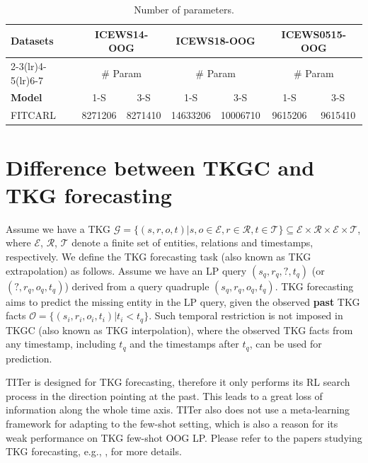 \documentclass[runningheads]{llncs}
\begin{document}
\begin{table}[htbp]
\caption{Number of parameters.}
    \label{tab: num of param}
      \centering
        \begin{tabular}{lcccccc} 
      \toprule %
     \multicolumn{1}{l}{\textbf{Datasets}} & \multicolumn{2}{c}{\textbf{ICEWS14-OOG}} & \multicolumn{2}{c}{\textbf{ICEWS18-OOG}} &\multicolumn{2}{c}{\textbf{ICEWS0515-OOG}} \\
      \cmidrule(lr){2-3}\cmidrule(lr){4-5}\cmidrule(lr){6-7}
       & \multicolumn{2}{c}{\# Param}  & \multicolumn{2}{c}{\# Param} & \multicolumn{2}{c}{\# Param} \\
      \textbf{Model} & 1-S & 3-S & 1-S & 3-S & 1-S & 3-S\\
       \midrule
       FITCARL & 8271206 & 8271410 & 14633206 & 10006710 & 9615206 & 9615410 \\
       
      \bottomrule %
    \end{tabular} 
        
    
\end{table}
\section{Difference between TKGC and TKG forecasting}
Assume we have a TKG $\mathcal{G} = \{(s,r,o,t)|s,o \in \mathcal{E}, r \in \mathcal{R}, t \in \mathcal{T}\} \subseteq \mathcal{E} \times \mathcal{R} \times \mathcal{E} \times \mathcal{T}$, where $\mathcal{E}$, $\mathcal{R}$, $\mathcal{T}$ denote a finite set of entities, relations and timestamps, respectively. We define the TKG forecasting task (also known as TKG extrapolation) as follows. Assume we have an LP query $(s_q,r_q,?,t_q)$ (or $(?,r_q,o_q,t_q)$) derived from a query quadruple $(s_q,r_q,o_q,t_q)$.
TKG forecasting aims to predict the missing entity in the LP query, given the observed \textbf{past} TKG facts $\mathcal{O} = \{(s_i, r_i, o_i, t_i)|t_i < t_q\}$. Such temporal restriction is not imposed in TKGC (also known as TKG interpolation), where the observed TKG facts from any timestamp, including $t_q$ and the timestamps after $t_q$, can be used for prediction.

TITer is designed for TKG forecasting, therefore it only performs its RL search process in the direction pointing at the past. This leads to a great loss of information along the whole time axis. TITer also does not use a meta-learning framework for adapting to the few-shot setting, which is also a reason for its weak performance on TKG few-shot OOG LP. Please refer to the papers studying TKG forecasting, e.g., \cite{DBLP:journals/corr/abs-1904-05530,DBLP:conf/emnlp/HanDMGT21}, for more details.
\end{document}
